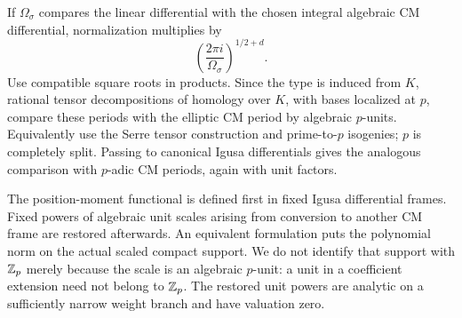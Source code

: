 If $\Omega_\sigma$ compares the linear differential with the chosen
integral algebraic CM differential, normalization multiplies by
\begin{equation}\label{eq:unary-period-normalization}
 \left(\frac{2\pi i}{\Omega_\sigma}\right)^{1/2+d}.
\end{equation}
Use compatible square roots in products.  Since the type is induced from
$K$, rational tensor decompositions of homology over $K$, with bases
localized at $p$, compare these periods with the elliptic CM period by
algebraic $p$-units.  Equivalently use the Serre tensor construction and
prime-to-$p$ isogenies; $p$ is completely split.  Passing to canonical
Igusa differentials gives the analogous comparison with $p$-adic CM
periods, again with unit factors.

\begin{convention}\label{conv:scaled-support}
 The position-moment functional is defined first in fixed Igusa
 differential frames.  Fixed powers of algebraic unit scales arising
 from conversion to another CM frame are restored afterwards.  An
 equivalent formulation puts the polynomial norm on the actual scaled
 compact support.  We do not identify that support with $\mathbb Z_p$ merely
 because the scale is an algebraic $p$-unit: a unit in a coefficient
 extension need not belong to $\mathbb Z_p$.  The restored unit powers are
 analytic on a sufficiently narrow weight branch and have valuation
 zero.
\end{convention}

